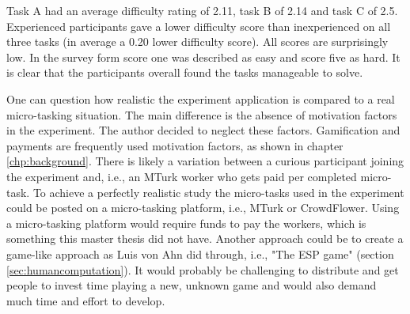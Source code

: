 Task A had an average difficulty rating of 2.11, task B of 2.14 and task C of 2.5. Experienced participants gave a lower difficulty score than inexperienced on all three tasks (in average a 0.20 lower difficulty score). All scores are surprisingly low. In the survey form score one was described as easy and score five as hard. It is clear that the participants overall found the tasks manageable to solve. 


One can question how realistic the experiment application is compared to a real micro-tasking situation. The main difference is the absence of motivation factors in the experiment. The author decided to neglect these factors. Gamification and payments are frequently used motivation factors, as shown in chapter \ref{chp:background}. There is likely a variation between a curious participant joining the experiment and, i.e., an MTurk worker who gets paid per completed micro-task. To achieve a perfectly realistic study the micro-tasks used in the experiment could be posted on a micro-tasking platform, i.e., MTurk or CrowdFlower. Using a micro-tasking platform would require funds to pay the workers, which is something this master thesis did not have. Another approach could be to create a game-like approach as Luis von Ahn did through, i.e., "The ESP game" (section \ref{sec:humancomputation}). It would probably be challenging to distribute and get people to invest time playing a new, unknown game and would also demand much time and effort to develop. 

